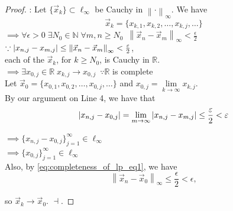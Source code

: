 \documentclass[notoc,notitlepage]{tufte-book}
\newcommand{\norm}[1]{\left\| #1 \right\|}
\begin{document}
\begin{proof}
  : Let $\{ \vec{x}_k \} \subset \ell_\infty$ be Cauchy in $\norm\cdot_\infty$. We have
  \begin{equation*}
    \vec{x}_k = \{ x_{k, 1}, x_{k, 2}, \ldots, x_{k, j}, \ldots \}
  \end{equation*}
  $\implies \forall \epsilon > 0 \; \exists N_0 \in \mathbb{N} \; \forall m, n \geq N_0 \enspace \norm{\vec{x}_n - \vec{x}_m}_\infty < \frac{\epsilon}{2}$ \\
  $\because \abs{ x_{n, j} - x_{m, j} } \leq \norm{\vec{x}_n - \vec{x}_m}_\infty < \frac{\epsilon}{2}$,\\
  each of the $\vec{x}_k$, for $k \geq N_0$, is Cauchy in $\mathbb{R}$. \\
  $\implies \exists x_{0, j} \in \mathbb{R} \; x_{k, j} \to x_{0, j} \enspace \because \mathbb{R}$ is complete \\
  Let $\vec{x}_0 = \{ x_{0, 1}, x_{0, 2}, \ldots, x_{0, j}, \ldots \}$ and $x_{0, j} = \lim\limits_{k \to \infty} x_{k, j}$. \\ By our argument on Line 4, we have that
  \begin{equation}\label{eq:completeness_of_lp_eq1}
    \left|x_{n, j} - x_{0, j}\right| = \lim_{m \to \infty} \left| x_{n, j} - x_{m, j} \right| \leq \frac{\varepsilon}{2} < \varepsilon
  \end{equation}

  $\implies \{ x_{n, j} - x_{0, j} \}_{j = 1}^{\infty} \in \ell_\infty$ \\
  $\implies \{ x_{0, j} \}_{j = 1}^{\infty} \in \ell_\infty$ \\
  Also, by \cref{eq:completeness_of_lp_eq1}, we have
  \begin{equation*}
    \norm{\vec{x}_n - \vec{x}_0}_\infty \leq \frac{\epsilon}{2} < \epsilon,
  \end{equation*}

  so $\vec{x}_k \to \vec{x}_0$. $\dashv$.


\end{proof}
\end{document}

